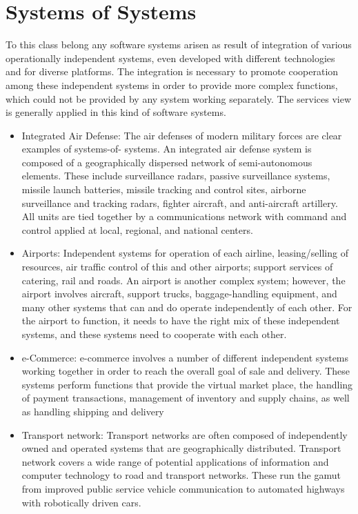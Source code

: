 \chapter{Systems of Systems}\label{ch:SoS}
To this class belong any software systems arisen as result of integration of various operationally independent systems, even developed with different technologies and for diverse platforms. The integration is necessary to promote cooperation among these independent systems in order to provide more complex functions, which could not be provided by any system working separately. The services view is generally applied in this kind of software systems.
\begin{itemize}                                           	
\item Integrated Air Defense: The air defenses of modern military forces are
clear examples of systems-of- systems. An integrated air defense system is composed of a geographically dispersed network of semi-autonomous elements. These include surveillance radars, passive surveillance systems, missile launch batteries, missile tracking and control sites, airborne surveillance and tracking radars, fighter aircraft, and anti-aircraft artillery. All units are tied together by a communications network with command and control applied at local, regional, and national centers.
 
\item Airports: Independent systems for operation of each airline,
leasing/selling of resources, air traffic control of this and other airports; support services of catering, rail and roads. An airport is another complex system; however, the airport involves aircraft, support trucks, baggage-handling equipment, and many other systems that can and do operate independently of each other. For the airport to function, it needs to have the right mix of these independent systems, and these systems need to cooperate with each other.
 
\item e-Commerce: e-commerce involves a number of different independent systems
working together in order to reach the overall goal of sale and delivery. These systems perform functions that provide the virtual market place, the handling of payment transactions, management of inventory and supply chains, as well as handling shipping and delivery
                                            	
\item Transport network: Transport networks are often composed of independently
owned and operated systems that are geographically distributed.  Transport network covers a wide range of potential applications of information and computer technology to road and transport networks. These run the gamut from improved public service vehicle communication to automated highways with robotically driven cars.
\end{itemize}